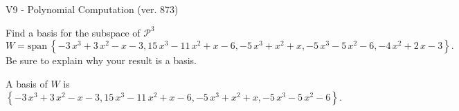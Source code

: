 \begin{exercise}
  \begin{exerciseTitle}V9 - Polynomial Computation (ver. 873)\end{exerciseTitle}
  \begin{exerciseStatement}
    Find a basis for the subspace of \(\mathcal{P}^3\) 
\[W=\mathrm{span}\ \left\{-3 \, x^{3} + 3 \, x^{2} - x - 3 , 15 \, x^{3} - 11 \, x^{2} + x - 6 , -5 \, x^{3} + x^{2} + x , -5 \, x^{3} - 5 \, x^{2} - 6 , -4 \, x^{2} + 2 \, x - 3\right\}.\]
 Be sure to explain why your result is a basis.


  \end{exerciseStatement}
  \begin{exerciseAnswer}
   A basis of \(W\) is  \(\left\{-3 \, x^{3} + 3 \, x^{2} - x - 3 , 15 \, x^{3} - 11 \, x^{2} + x - 6 , -5 \, x^{3} + x^{2} + x , -5 \, x^{3} - 5 \, x^{2} - 6\right\}\).
  


  \end{exerciseAnswer}
\end{exercise}